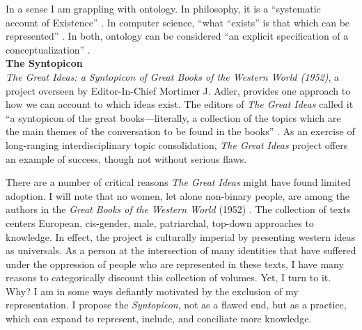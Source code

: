 In a sense I am grappling with ontology. In philosophy, it is a “systematic account of Existence” \citep[p. 1]{gruber_toward_1995}.  In computer science, “what “exists” is that which can be represented” \citep[p. 1]{gruber_toward_1995}. In both, ontology can be considered “an explicit specification of a conceptualization” \citep[p. 1]{gruber_toward_1995}. \\
\textbf{The Syntopicon} \\
\textit{The Great Ideas: a Syntopicon of Great Books of the Western World (1952)}, a project overseen by Editor-In-Chief Mortimer J. Adler, provides one approach to how we can account to which ideas exist. The editors of \textit{The Great Ideas} called it “a syntopicon of the great books—literally, a collection of the topics which are the main themes of the conversation to be found in the books” \citep[p. xii]{adler_great_1952-2}. As an exercise of long-ranging interdisciplinary topic consolidation, \textit{The Great Ideas} project offers an example of success, though not without serious flaws. 

There are a number of critical reasons \textit{The Great Ideas} might have found limited adoption. I will note that no women, let alone non-binary people, are among the authors in the \textit{Great Books of the Western World} (1952) \citep{hutchins_great_1952}. The collection of texts centers European, cis-gender, male, patriarchal, top-down approaches to knowledge. In effect, the project is culturally imperial by presenting western ideas as universals. As a person at the intersection of many identities that have suffered under the oppression of people who are represented in these texts, I have many reasons to categorically discount this collection of volumes. Yet, I turn to it. Why? I am in some ways defiantly motivated by the exclusion of my representation. I propose the \textit{Syntopicon}, not as a flawed end, but as a practice, which can expand to represent, include, and conciliate more knowledge.

